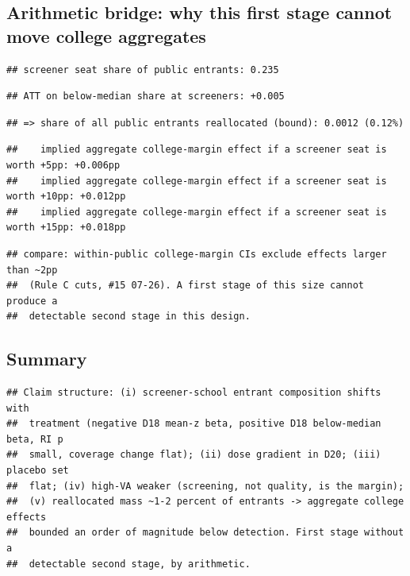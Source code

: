 \documentclass[
]{article}
\begin{document}
\hypertarget{arithmetic-bridge-why-this-first-stage-cannot-move-college-aggregates}{%
\subsection{Arithmetic bridge: why this first stage cannot move college
aggregates}\label{arithmetic-bridge-why-this-first-stage-cannot-move-college-aggregates}}

\begin{verbatim}
## screener seat share of public entrants: 0.235
\end{verbatim}

\begin{verbatim}
## ATT on below-median share at screeners: +0.005
\end{verbatim}

\begin{verbatim}
## => share of all public entrants reallocated (bound): 0.0012 (0.12%)
\end{verbatim}

\begin{verbatim}
##    implied aggregate college-margin effect if a screener seat is worth +5pp: +0.006pp
##    implied aggregate college-margin effect if a screener seat is worth +10pp: +0.012pp
##    implied aggregate college-margin effect if a screener seat is worth +15pp: +0.018pp
\end{verbatim}

\begin{verbatim}
## compare: within-public college-margin CIs exclude effects larger than ~2pp
##  (Rule C cuts, #15 07-26). A first stage of this size cannot produce a
##  detectable second stage in this design.
\end{verbatim}

\hypertarget{summary}{%
\subsection{Summary}\label{summary}}

\begin{verbatim}
## Claim structure: (i) screener-school entrant composition shifts with
##  treatment (negative D18 mean-z beta, positive D18 below-median beta, RI p
##  small, coverage change flat); (ii) dose gradient in D20; (iii) placebo set
##  flat; (iv) high-VA weaker (screening, not quality, is the margin);
##  (v) reallocated mass ~1-2 percent of entrants -> aggregate college effects
##  bounded an order of magnitude below detection. First stage without a
##  detectable second stage, by arithmetic.
\end{verbatim}
\end{document}
